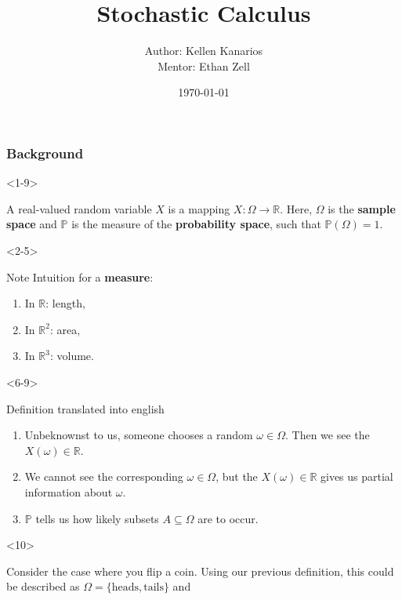 \documentclass[10pt]{beamer}
\title{Stochastic Calculus}
\author{Author: Kellen Kanarios \\ Mentor: Ethan Zell}
\institute{University of Michigan}
\date{\today}
\begin{document}
\begin{frame}
\titlepage
\end{frame}

\begin{frame}[t]
  \frametitle{Background}
  \begin{onlyenv}<1-9>
    \begin{definition}
      A real-valued random variable $X$ is a mapping $X : \Omega \to \mathbb{R}$. Here, $\Omega$ is the \textbf{sample space} and $\mathbb{P}$ is the measure of the \textbf{probability space}, such that $\mathbb{P}(\Omega) = 1$.
    \end{definition}
  \end{onlyenv}
  \begin{onlyenv}<2-5>
      \begin{block}{Note}
        Intuition for a \textbf{measure}:
        \begin{enumerate}
          \item <3-> In $\mathbb{R}$: length,
          \item <4-> In $\mathbb{R}^2$: area,
          \item <5-> In $\mathbb{R}^3$: volume.
        \end{enumerate}
      \end{block}
  \end{onlyenv}
  \begin{onlyenv}<6-9>
      \begin{block}{Definition translated into english}
        \begin{enumerate}
          \item<7->
            Unbeknownst to us, someone chooses a random $\omega \in \Omega$. Then we see the $X(\omega) \in \mathbb{R}$.
          \item<8->
            We cannot see the corresponding $\omega \in \Omega$, but the $X(\omega) \in \mathbb{R}$ gives us partial information about $\omega$.
          \item<9-> $\mathbb{P}$ tells us how likely subsets $A \subseteq \Omega$ are to occur.
        \end{enumerate}
      \end{block}
  \end{onlyenv}
  \begin{onlyenv}<10>
    \begin{example}
      Consider the case where you flip a coin. Using our previous definition, this could be described as $\Omega = \{\text{heads}, \text{tails}\}$ and \\

\end{example}
\end{onlyenv}
\end{frame}
\end{document}

